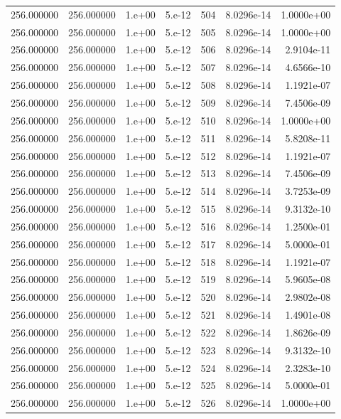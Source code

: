 \begin{table}[htbp]
\begin{tabular}{rrrrrrr}
256.000000 & 256.000000 & 1.e+00 & 5.e-12 & 504 & 8.0296e-14 & 1.0000e+00 \\
256.000000 & 256.000000 & 1.e+00 & 5.e-12 & 505 & 8.0296e-14 & 1.0000e+00 \\
256.000000 & 256.000000 & 1.e+00 & 5.e-12 & 506 & 8.0296e-14 & 2.9104e-11 \\
256.000000 & 256.000000 & 1.e+00 & 5.e-12 & 507 & 8.0296e-14 & 4.6566e-10 \\
256.000000 & 256.000000 & 1.e+00 & 5.e-12 & 508 & 8.0296e-14 & 1.1921e-07 \\
256.000000 & 256.000000 & 1.e+00 & 5.e-12 & 509 & 8.0296e-14 & 7.4506e-09 \\
256.000000 & 256.000000 & 1.e+00 & 5.e-12 & 510 & 8.0296e-14 & 1.0000e+00 \\
256.000000 & 256.000000 & 1.e+00 & 5.e-12 & 511 & 8.0296e-14 & 5.8208e-11 \\
256.000000 & 256.000000 & 1.e+00 & 5.e-12 & 512 & 8.0296e-14 & 1.1921e-07 \\
256.000000 & 256.000000 & 1.e+00 & 5.e-12 & 513 & 8.0296e-14 & 7.4506e-09 \\
256.000000 & 256.000000 & 1.e+00 & 5.e-12 & 514 & 8.0296e-14 & 3.7253e-09 \\
256.000000 & 256.000000 & 1.e+00 & 5.e-12 & 515 & 8.0296e-14 & 9.3132e-10 \\
256.000000 & 256.000000 & 1.e+00 & 5.e-12 & 516 & 8.0296e-14 & 1.2500e-01 \\
256.000000 & 256.000000 & 1.e+00 & 5.e-12 & 517 & 8.0296e-14 & 5.0000e-01 \\
256.000000 & 256.000000 & 1.e+00 & 5.e-12 & 518 & 8.0296e-14 & 1.1921e-07 \\
256.000000 & 256.000000 & 1.e+00 & 5.e-12 & 519 & 8.0296e-14 & 5.9605e-08 \\
256.000000 & 256.000000 & 1.e+00 & 5.e-12 & 520 & 8.0296e-14 & 2.9802e-08 \\
256.000000 & 256.000000 & 1.e+00 & 5.e-12 & 521 & 8.0296e-14 & 1.4901e-08 \\
256.000000 & 256.000000 & 1.e+00 & 5.e-12 & 522 & 8.0296e-14 & 1.8626e-09 \\
256.000000 & 256.000000 & 1.e+00 & 5.e-12 & 523 & 8.0296e-14 & 9.3132e-10 \\
256.000000 & 256.000000 & 1.e+00 & 5.e-12 & 524 & 8.0296e-14 & 2.3283e-10 \\
256.000000 & 256.000000 & 1.e+00 & 5.e-12 & 525 & 8.0296e-14 & 5.0000e-01 \\
256.000000 & 256.000000 & 1.e+00 & 5.e-12 & 526 & 8.0296e-14 & 1.0000e+00 \\

\end{tabular}
\end{table}
